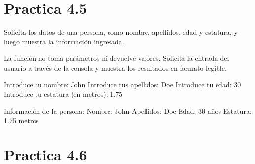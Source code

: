 \documentclass[letterpaper,10pt,spanish]{sphinxmanual}
\begin{document}
\section{Practica 4.5}
\label{\detokenize{pr4:module-pr4.5}}\label{\detokenize{pr4:practica-4-5}}

\begin{fulllineitems}
\label{\detokenize{pr4:pr4.5.registrar_persona}}
\pysigstartsignatures
{}
\pysigstopsignatures
\sphinxAtStartPar
Solicita los datos de una persona, como nombre, apellidos, edad y estatura,
y luego muestra la información ingresada.

\sphinxAtStartPar
La función no toma parámetros ni devuelve valores. Solicita la entrada del
usuario a través de la consola y muestra los resultados en formato legible.
\begin{description}
\sphinxAtStartPar
Introduce tu nombre: John
Introduce tus apellidos: Doe
Introduce tu edad: 30
Introduce tu estatura (en metros): 1.75

\sphinxAtStartPar
Información de la persona:
Nombre: John
Apellidos: Doe
Edad: 30 años
Estatura: 1.75 metros

\end{description}

\end{fulllineitems}



\section{Practica 4.6}
\label{\detokenize{pr4:module-pr4.6}}\label{\detokenize{pr4:practica-4-6}}
\end{document}
